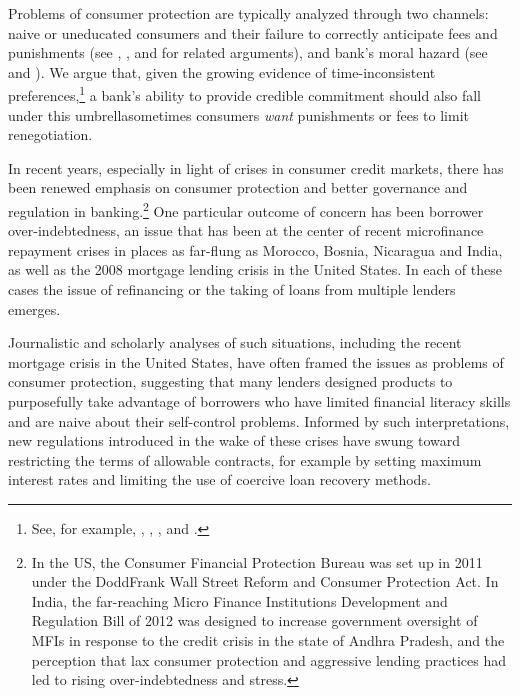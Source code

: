 \documentclass[11pt,english]{article}
\theoremstyle{plain}
\theoremstyle{definition}
\begin{document}
Problems of consumer protection are typically analyzed through two
channels: naive or uneducated consumers and their failure to correctly
anticipate fees and punishments (see \citet{gabaix_shrouded_2006},
\citet{armstrong_consumer_2012}, and \citet{akerlof_phishing_2015}
for related arguments), and bank's moral hazard (see \citet{dewatripont_prudential_1999}
and \citet{oak_only_2010}). We argue that, given the growing evidence
of time-inconsistent preferences,\footnote{See, for example, \citet{laibson_debt_2003}, \citet{ashraf_tying_2006},
\citet{gugerty_you_2007}, and \citet{tanaka_risk_2010}.} a bank's ability to provide credible commitment should also fall
under this umbrella\textendash sometimes consumers \textit{want} punishments
or fees to limit renegotiation.

In recent years, especially in light of crises in consumer credit
markets, there has been renewed emphasis on consumer protection and
better governance and regulation in banking.\footnote{In the US, the Consumer Financial Protection Bureau was set up in
2011 under the Dodd\textendash Frank Wall Street Reform and Consumer
Protection Act. In India, the far-reaching Micro Finance Institutions
Development and Regulation Bill of 2012 was designed to increase government
oversight of MFIs in response to the credit crisis in the state of
Andhra Pradesh, and the perception that lax consumer protection and
aggressive lending practices had led to rising over-indebtedness and
stress.} One particular outcome of concern has been borrower over-indebtedness,
an issue that has been at the center of recent microfinance repayment
crises in places as far-flung as Morocco, Bosnia, Nicaragua and India,
as well as the 2008 mortgage lending crisis in the United States.
In each of these cases the issue of refinancing or the taking of loans
from multiple lenders emerges.

Journalistic and scholarly analyses of such situations, including
the recent mortgage crisis in the United States, have often framed
the issues as problems of consumer protection, suggesting that many
lenders designed products to purposefully take advantage of borrowers
who have limited financial literacy skills and are naive about their
self-control problems. Informed by such interpretations, new regulations
introduced in the wake of these crises have swung toward restricting
the terms of allowable contracts, for example by setting maximum interest
rates and limiting the use of coercive loan recovery methods.
\end{document}
